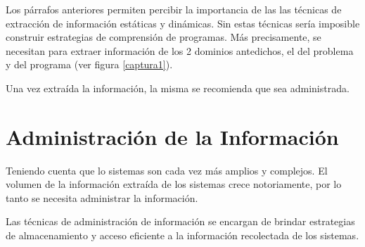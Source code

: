 \documentclass[a4paper,12pt]{report}
\begin{document}

Los párrafos anteriores permiten percibir la importancia de las las técnicas de extracción de información estáticas y dinámicas. Sin estas técnicas sería imposible construir estrategias de comprensión de programas. Más precisamente, se necesitan para extraer información de los 2 dominios antedichos, el del problema y del programa (ver figura \ref{captura1}).

Una vez extraída la información, la misma se recomienda que sea administrada.





\section{Administración de la Información}

Teniendo cuenta que lo sistemas son cada vez más amplios y complejos. El volumen de la información extraída de los sistemas crece notoriamente, por lo tanto se necesita administrar la información.

Las técnicas de administración de información se encargan de brindar estrategias de almacenamiento y acceso eficiente a la información recolectada de los sistemas. 
\end{document}
